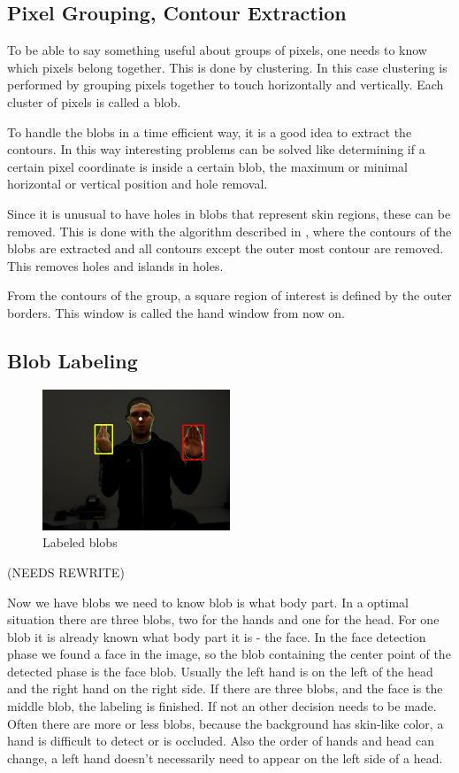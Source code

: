 \subsection*{Pixel Grouping, Contour Extraction}
To be able to say something useful about groups of pixels, one needs to know which pixels belong together. This is done by clustering. In this case clustering is performed by grouping pixels together to touch horizontally and vertically. Each cluster of pixels is called a blob.

To handle the blobs in a time efficient way, it is a good idea to extract the contours. In this way interesting problems can be solved like determining if a certain pixel coordinate is inside a certain blob, the maximum or minimal horizontal or vertical position and hole removal.

Since it is unusual to have holes in blobs that represent skin regions, these can be removed. This is done with the algorithm described in \cite{Suzuki1985}, where the contours of the blobs are extracted and all contours except the outer most contour are removed. This removes holes and islands in holes.

From the contours of the group, a square region of interest is defined by the outer borders. This window is called the hand window from now on.

\subsection*{Blob Labeling}

\begin{figure}[htbp]
    \center{}
    \includegraphics[width=0.5\textwidth]{figures/pipeline/contours.jpg}
	\caption{Labeled blobs}
	\label{fig:contours}
\end{figure}

(NEEDS REWRITE)

Now we have blobs we need to know blob is what body part. In a optimal situation there are three blobs, two for the hands and one for the head. For one blob it is already known what body part it is - the face. In the face detection phase we found a face in the image, so the blob containing the center point of the detected phase is the face blob. Usually the left hand is on the left of the head and the right hand on the right side. If there are three blobs, and the face is the middle blob, the labeling is finished. If not an other decision needs to be made. Often there are more or less blobs, because the background has skin-like color, a hand is difficult to detect or is occluded. Also the order of hands and head can change, a left hand doesn't necessarily need to appear on the left side of a head.

